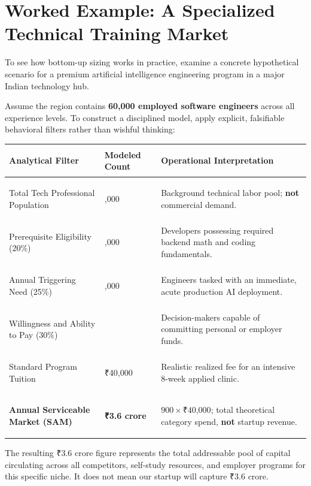 \section{Worked Example: A Specialized Technical Training Market}

To see how bottom-up sizing works in practice, examine a concrete hypothetical scenario for a premium artificial intelligence engineering program in a major Indian technology hub.

Assume the region contains \textbf{60,000 employed software engineers} across all experience levels. To construct a disciplined model, apply explicit, falsifiable behavioral filters rather than wishful thinking:

\begin{tcolorbox}[
  enhanced,
  colback=BayesSurface!60,
  colframe=BayesBorder,
  boxrule=0.5pt,
  arc=3pt,
  left=3pt,right=3pt,top=3pt,bottom=3pt,
  boxsep=1pt
]
\scriptsize
\begin{tabularx}{\linewidth}{>{\bfseries\raggedright\arraybackslash}p{2.3cm} >{\raggedleft\arraybackslash}p{1.4cm} X}
\toprule
\textbf{Analytical Filter} & \textbf{Modeled Count} & \textbf{Operational Interpretation} \\
\midrule
Total Tech Professional Population & 60,000 & Background technical labor pool; \textbf{not} commercial demand. \\
\addlinespace[2pt]
Prerequisite Eligibility (20\%) & 12,000 & Developers possessing required backend math and coding fundamentals. \\
\addlinespace[2pt]
Annual Triggering Need (25\%) & 3,000 & Engineers tasked with an immediate, acute production AI deployment. \\
\addlinespace[2pt]
Willingness and Ability to Pay (30\%) & 900 & Decision-makers capable of committing personal or employer funds. \\
\addlinespace[2pt]
Standard Program Tuition & ₹40,000 & Realistic realized fee for an intensive 8-week applied clinic. \\
\midrule
\textbf{Annual Serviceable Market (SAM)} & \textbf{₹3.6 crore} & $900 \times \text{₹40,000}$; total theoretical category spend, \textbf{not} startup revenue. \\
\bottomrule
\end{tabularx}
\end{tcolorbox}

The resulting ₹3.6 crore figure represents the total addressable pool of capital circulating across all competitors, self-study resources, and employer programs for this specific niche. It does not mean our startup will capture ₹3.6 crore.

